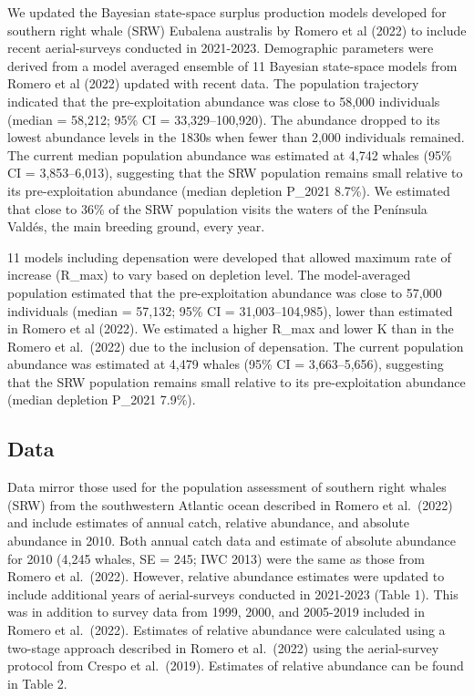\documentclass[
]{article}
\begin{document}
We updated the Bayesian state-space surplus production models developed
for southern right whale (SRW) Eubalena australis by Romero et al (2022)
to include recent aerial-surveys conducted in 2021-2023. Demographic
parameters were derived from a model averaged ensemble of 11 Bayesian
state-space models from Romero et al (2022) updated with recent data.
The population trajectory indicated that the pre-exploitation abundance
was close to 58,000 individuals (median = 58,212; 95\% CI =
33,329--100,920). The abundance dropped to its lowest abundance levels
in the 1830s when fewer than 2,000 individuals remained. The current
median population abundance was estimated at 4,742 whales (95\% CI =
3,853--6,013), suggesting that the SRW population remains small relative
to its pre-exploitation abundance (median depletion P\_2021 8.7\%). We
estimated that close to 36\% of the SRW population visits the waters of
the Península Valdés, the main breeding ground, every year.

11 models including depensation were developed that allowed maximum rate
of increase (R\_max) to vary based on depletion level. The
model-averaged population estimated that the pre-exploitation abundance
was close to 57,000 individuals (median = 57,132; 95\% CI =
31,003--104,985), lower than estimated in Romero et al (2022). We
estimated a higher R\_max and lower K than in the Romero et al.~(2022)
due to the inclusion of depensation. The current population abundance
was estimated at 4,479 whales (95\% CI = 3,663--5,656), suggesting that
the SRW population remains small relative to its pre-exploitation
abundance (median depletion P\_2021 7.9\%).

\hypertarget{data}{%
\subsection{Data}\label{data}}

Data mirror those used for the population assessment of southern right
whales (SRW) from the southwestern Atlantic ocean described in Romero et
al.~(2022) and include estimates of annual catch, relative abundance,
and absolute abundance in 2010. Both annual catch data and estimate of
absolute abundance for 2010 (4,245 whales, SE = 245; IWC 2013) were the
same as those from Romero et al.~(2022). However, relative abundance
estimates were updated to include additional years of aerial-surveys
conducted in 2021-2023 (Table 1). This was in addition to survey data
from 1999, 2000, and 2005-2019 included in Romero et al.~(2022).
Estimates of relative abundance were calculated using a two-stage
approach described in Romero et al.~(2022) using the aerial-survey
protocol from Crespo et al.~(2019). Estimates of relative abundance can
be found in Table 2.
\end{document}
